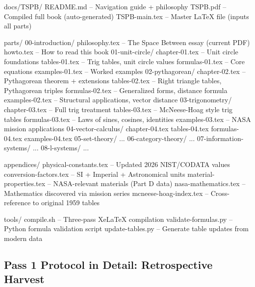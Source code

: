 \documentclass[11pt,letterpaper]{article}
\begin{document}
\begin{asciibox}
docs/TSPB/
  README.md                      -- Navigation guide + philosophy
  TSPB.pdf                       -- Compiled full book (auto-generated)
  TSPB-main.tex                  -- Master LaTeX file (inputs all parts)

  parts/
    00-introduction/
      philosophy.tex             -- The Space Between essay (current PDF)
      howto.tex                  -- How to read this book
    01-unit-circle/
      chapter-01.tex             -- Unit circle foundations
      tables-01.tex              -- Trig tables, unit circle values
      formulas-01.tex            -- Core equations
      examples-01.tex            -- Worked examples
    02-pythagorean/
      chapter-02.tex             -- Pythagorean theorem + extensions
      tables-02.tex              -- Right triangle tables, Pythagorean triples
      formulas-02.tex            -- Generalized forms, distance formula
      examples-02.tex            -- Structural applications, vector distance
    03-trigonometry/
      chapter-03.tex             -- Full trig treatment
      tables-03.tex              -- McNeese-Hoag style trig tables
      formulas-03.tex            -- Laws of sines, cosines, identities
      examples-03.tex            -- NASA mission applications
    04-vector-calculus/
      chapter-04.tex
      tables-04.tex
      formulas-04.tex
      examples-04.tex
    05-set-theory/
      ...
    06-category-theory/
      ...
    07-information-systems/
      ...
    08-l-systems/
      ...

  appendices/
    physical-constants.tex       -- Updated 2026 NIST/CODATA values
    conversion-factors.tex       -- SI + Imperial + Astronomical units
    material-properties.tex      -- NASA-relevant materials (Part D data)
    nasa-mathematics.tex         -- Mathematics discovered via mission series
    mcneese-hoag-index.tex       -- Cross-reference to original 1959 tables

  tools/
    compile.sh                   -- Three-pass XeLaTeX compilation
    validate-formulas.py         -- Python formula validation script
    update-tables.py             -- Generate table updates from modern data
\end{asciibox}

\subsection{Pass 1 Protocol in Detail: Retrospective Harvest}
\end{document}

